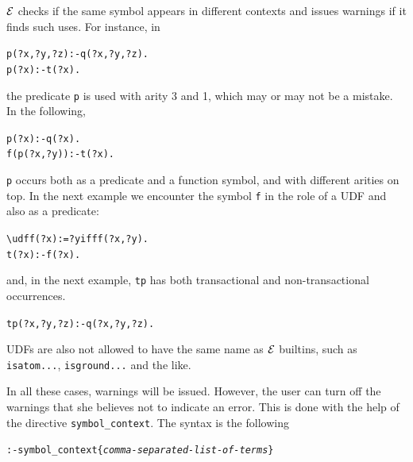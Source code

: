 \documentclass[11pt]{article}
\newcommand{\ERGO}{\mbox{\ensuremath{\cal{E}}\smaller{{\sc{RGO}}}}\xspace}
\newcommand{\FLSYSTEM}{\ERGO}
\newcommand{\bs}{\textbackslash}
\begin{document}
\FLSYSTEM checks if the same symbol appears in different contexts
and issues warnings if it finds such uses. For instance, in
\begin{alltt}
	p(?x,?y,?z):-q(?x,?y,?z).
	p(?x):-t(?x).
\end{alltt}
the predicate \texttt{p} is used with arity 3 and 1, which may or may not be a
mistake. In the following,
\begin{alltt}
	p(?x):-q(?x).
	f(p(?x,?y)):-t(?x).
\end{alltt}
\texttt{p} occurs both as a predicate and a function symbol, and with
different arities on top. In the next example we encounter the symbol
\texttt{f} in the role of a UDF and also as a predicate:  
\begin{alltt}
	\bs{}udf f(?x):=?y if ff(?x,?y).
	t(?x):-f(?x).
\end{alltt}
and, in the next example, \texttt{tp} has both transactional and
non-transactional occurrences. 
\begin{alltt}
	tp(?x,?y,?z):-q(?x,?y,?z).
\end{alltt}
UDFs are also not allowed to have the same name as \FLSYSTEM builtins, such
as \texttt{isatom{...}}, \texttt{isground{...}} and the like.  


In all these cases, warnings will be issued. However, the user can turn off
the warnings that she believes not to indicate an error. This is done with
the help of the directive
\texttt{symbol\_context}.  The syntax is the following
\begin{alltt}
:- symbol_context\{\textnormal{\emph{comma-separated-list-of-terms}}\}
\end{alltt}
\end{document}
